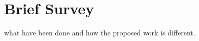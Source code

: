 \section{Brief Survey}
\label{sec:intro}

what have been done and how the proposed work is
different.
